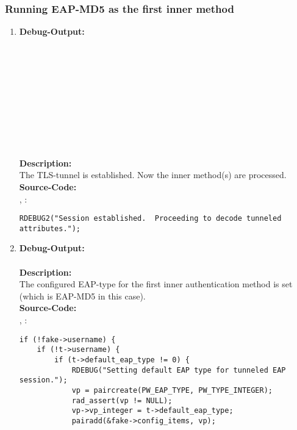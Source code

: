 \subsubsection*{Running EAP-MD5 as the first inner method}
\label{section:running_eap_md5_as_the_first_inner_method}
\begin{enumerate}
\item \textbf{Debug-Output:}\\
\\
\\
\\
\\
\\
\\
\\
\\
\\
\\
\newline
\textbf{Description:}\\
The TLS-tunnel is established. Now the inner method(s) are processed.\\
\newline
\textbf{Source-Code:}\\
, :
\begin{lstlisting}
RDEBUG2("Session established.  Proceeding to decode tunneled attributes.");
\end{lstlisting}

\item \textbf{Debug-Output:}\\
\\
\newline
\textbf{Description:}\\
The configured EAP-type for the first inner authentication method is set (which is EAP-MD5 in this case).\\
\newline
\textbf{Source-Code:}\\
, :
\begin{lstlisting}
if (!fake->username) {
	if (!t->username) {
		if (t->default_eap_type != 0) {
			RDEBUG("Setting default EAP type for tunneled EAP session.");
			vp = paircreate(PW_EAP_TYPE, PW_TYPE_INTEGER);
			rad_assert(vp != NULL);
			vp->vp_integer = t->default_eap_type;
			pairadd(&fake->config_items, vp);
\end{lstlisting}


\end{enumerate}
